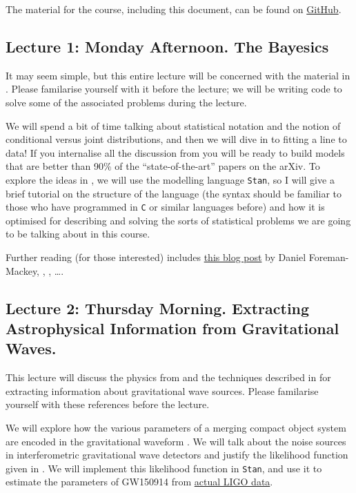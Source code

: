 \documentclass[modern]{aastex61}
\newcommand{\stan}{\texttt{Stan}}
\begin{document}
The material for the course, including this document, can be found on
\href{https://github.com/farr/GWDataAnalysisSummerSchool}{GitHub}.

\subsection{Lecture 1: Monday Afternoon.  The Bayesics}

It may seem simple, but this entire lecture will be concerned with the
material in \citet{Hogg2010}.  Please familarise yourself with it
before the lecture; we will be writing code to solve some of the
associated problems during the lecture.  

We will spend a bit of time talking about statistical notation and the
notion of conditional versus joint distributions, and then we will
dive in to fitting a line to data!  If you internalise all the
discussion from \citet{Hogg2010} you will be ready to build models
that are better than 90\% of the ``state-of-the-art'' papers on the
arXiv.  To explore the ideas in \citet{Hogg2010}, we will use the
modelling language \stan \citep{Stan}, so I will give a brief tutorial
on the structure of the language (the syntax should be familiar to
those who have programmed in \texttt{C} or similar languages before)
and how it is optimised for describing and solving the sorts of
statistical problems we are going to be talking about in this course.

Further reading (for those interested) includes
\href{http://dan.iel.fm/posts/fitting-a-plane/}{this blog post} by
Daniel Foreman-Mackey, \citet{Kelly2007}, \citet{Lieu2017}, \ldots.

\subsection{Lecture 2: Thursday Morning. Extracting Astrophysical
  Information from Gravitational Waves.}

This lecture will discuss the physics from
\citet{Abbott2017BasicPhysics} and the techniques described in
\citet{Veitch2015} for extracting information about gravitational wave
sources.  Please familarise yourself with these references before the
lecture.

We will explore how the various parameters of a merging compact object
system are encoded in the gravitational waveform
\citep{Abbott2017BasicPhysics}.  We will talk about the noise sources
in interferometric gravitational wave detectors and justify the
likelihood function given in \citet{Veitch2015}.  We will implement
this likelihood function in \stan{}, and use it to estimate the
parameters of GW150914 \citep{Abbott2016GW150914} from
\href{https://losc.ligo.org/events/GW150914/}{actual LIGO data}.
\end{document}
